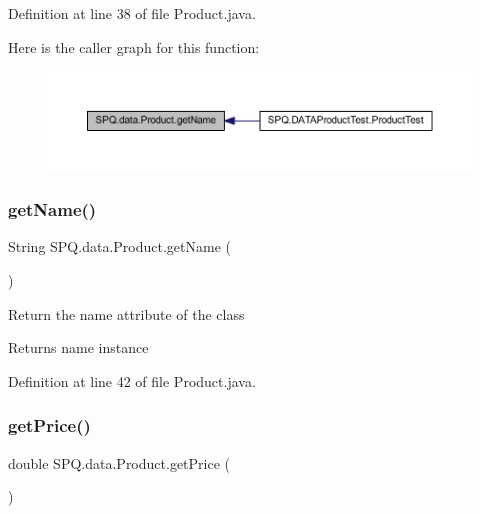 Definition at line 38 of file Product.\+java.

Here is the caller graph for this function\+:\nopagebreak
\begin{figure}[H]
\begin{center}
\leavevmode
\includegraphics[width=350pt]{class_s_p_q_1_1data_1_1_product_a03b62c19f01f4c231b742de9eba2ed25_icgraph}
\end{center}
\end{figure}
\mbox{\label{class_s_p_q_1_1data_1_1_product_a03b62c19f01f4c231b742de9eba2ed25}} 
\subsubsection{\texorpdfstring{get\+Name()}{getName()}\hspace{0.1cm}{\footnotesize\ttfamily [2/2]}}
{\footnotesize\ttfamily String S\+P\+Q.\+data.\+Product.\+get\+Name (\begin{DoxyParamCaption}{ }\end{DoxyParamCaption})}

Return the name attribute of the class \begin{DoxyReturn}{Returns}
name instance 
\end{DoxyReturn}


Definition at line 42 of file Product.\+java.

\mbox{\label{class_s_p_q_1_1data_1_1_product_ad8200addd74d2e3b6ea9cfff4e8b8c7e}} 
\subsubsection{\texorpdfstring{get\+Price()}{getPrice()}\hspace{0.1cm}{\footnotesize\ttfamily [1/2]}}
{\footnotesize\ttfamily double S\+P\+Q.\+data.\+Product.\+get\+Price (\begin{DoxyParamCaption}{ }\end{DoxyParamCaption})}



